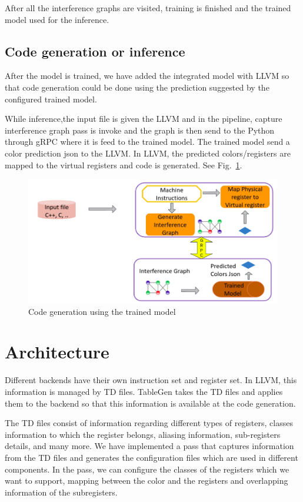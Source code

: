 After all the interference graphs are visited, training is finished and the trained model used for the inference.
\subsection{Code generation or inference}
After the model is trained, we have added the integrated model with LLVM so that code generation could be done using the prediction suggested by the configured trained model.

While inference,the input file is given the LLVM and in the pipeline,  capture interference graph pass is invoke and the graph is then send to the Python through gRPC where it is feed to the trained model. The trained model send a color prediction json to the LLVM. In LLVM, the predicted colors/registers are mapped to the virtual registers and code is generated. See Fig.~\ref{fig:mlra-inference}.
\begin{figure}[t]
    \centering
    \includegraphics[scale=0.4]{figures/chapter-5/mlra_inference.png}
    \caption{Code generation using the trained model}
     \label{fig:mlra-inference}
\end{figure}

\section{Architecture}\label{sec:mlra:arch}
Different backends have their own instruction set and register set. In LLVM, this information is managed by TD files. TableGen takes the TD files and applies them to the backend so that this information is available at the code generation.

The TD files consist of information regarding different types of registers, classes information to which the register belongs, aliasing information, sub-registers details, and many more.
We have implemented a pass that captures information from the TD files and generates the configuration files which are used in different components. In the pass, we can configure the classes of the registers which we want to support, mapping between the color and the registers and overlapping information of the subregisters. 

